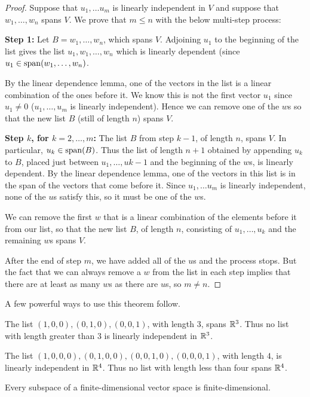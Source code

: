 \begin{proof}
    Suppose that $u_1, \dots u_m$ is linearly independent in $V$ and suppose that $w_1, \dots, w_n$ spans $V$. We prove that $m \le n$ with the below multi-step process:

    \textbf{Step 1:} Let $B = w_1, \dots, w_n$, which spans $V$. Adjoining $u_1$ to the beginning of the list gives the list $u_1, w_1, \dots, w_n$ which is linearly dependent (since $u_1\in\operatorname{span}(w_1, \dots, w_n)$.

    By the linear dependence lemma, one of the vectors in the list is a linear combination of the ones before it. We know this is not the first vector $u_1$ since $u_1\ne 0$ ($u_1, \dots, u_m$ is linearly independent). Hence we can remove one of the $w$s so that the new list $B$ (still of length $n$) spans $V$.

    \textbf{Step $k$, for $k =2, \dots, m$:}
    The list $B$ from step $k-1$, of length $n$, spans $V$. In particular, $u_k\in \operatorname{span}(B)$. Thus the list of length $n+1$ obtained by appending $u_k$ to $B$, placed just between $u_1, \dots, u{k-1}$ and the beginning of the $w$s, is linearly dependent. By the linear dependence lemma, one of the vectors in this list is in the span of the vectors that come before it. Since $u_1, \dots u_m$ is linearly independent, none of the $u$s satisfy this, so it must be one of the $w$s.

    We can remove the first $w$ that is a linear combination of the elements before it from our list, so that the new list $B$, of length $n$,  consisting of $u_1, \dots, u_k$ and the remaining $w$s spans $V$.

    After the end of step $m$, we have added all of the $u$s and the process stops. But the fact that we can always remove a $w$ from the list in each step implies that there are at least as many $w$s as there are $u$s, so $m \ne n$.
\end{proof}
A few powerful ways to use this theorem follow.
\begin{example}
    The list $(1,0,0),(0,1,0),(0,0,1)$, with length $3$, spans $\mathbb{R}^3$. Thus no list with length greater than $3$ is linearly independent in $\mathbb{R}^3$.
\end{example}
\begin{example}
    The list $(1,0,0,0),(0,1,0,0),(0,0,1,0),(0,0,0,1)$, with length $4$, is linearly independent in $\mathbb{R}^4$. Thus no list with length less than four spans $\mathbb{R}^4$.
\end{example}
\begin{theorem}
    Every subspace of a finite-dimensional vector space is finite-dimensional.
\end{theorem}

